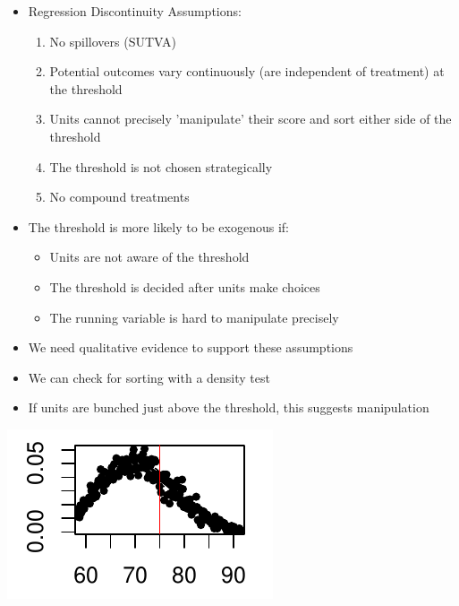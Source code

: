 \documentclass[xcolor=x11names,compress]{beamer}\usepackage[]{graphicx}\usepackage[]{color}
\renewcommand{\(}{\begin{columns}}
\renewcommand{\)}{\end{columns}}
\newcommand{\<}[1]{\begin{column}{#1}}
\renewcommand{\>}{\end{column}}
\begin{document}
\begin{frame}
\begin{itemize}
\item Regression Discontinuity Assumptions:
\begin{enumerate}
\item No spillovers (SUTVA)
\pause
\item Potential outcomes vary continuously (are independent of treatment) at the threshold
\pause
\item Units cannot precisely 'manipulate' their score and sort either side of the threshold
\pause
\item The threshold is not chosen strategically
\pause
\item No compound treatments
\end{enumerate}
\end{itemize}
\end{frame}

\begin{frame}
\begin{itemize}
\item The threshold is more likely to be exogenous if:
\pause
\begin{itemize}
\item Units are not aware of the threshold
\pause
\item The threshold is decided after units make choices
\pause
\item The running variable is hard to manipulate precisely
\pause
\end{itemize}
\item We need qualitative evidence to support these assumptions
\end{itemize}
\end{frame}

\begin{frame}
\begin{itemize}
\item We can check for sorting with a density test
\item If units are bunched just above the threshold, this suggests manipulation
\end{itemize}

\begin{center}
\includegraphics[scale=2]{figure/Density-2.pdf}
\end{center}
\end{frame}
\end{document}
